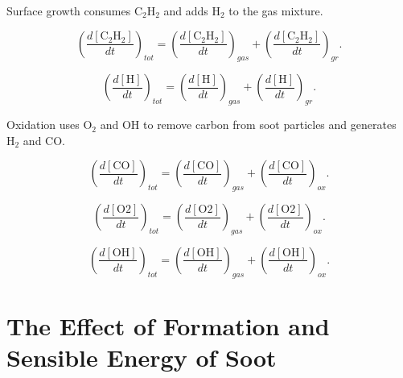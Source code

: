 Surface growth consumes $\mathrm{C_2H_2}$ and adds $\mathrm{H_2}$ to the gas mixture.

\begin{equation}
	\left(
	\frac{d\left[{\mathrm{C_2H_2}}\right]}{dt}
	\right)_{tot}
	= 
	\left(
	\frac{d\left[{\mathrm{C_2H_2}}\right]}{dt}
	\right)_{gas}
	+
	\left(
	\frac{d\left[{\mathrm{C_2H_2}}\right]}{dt}
	\right)_{gr}
	\label{eqn:C2H2scrub_total}.
\end{equation}


\begin{equation}
	\left(
	\frac{d\left[{\mathrm{H}}\right]}{dt}
	\right)_{tot}
	= 
	\left(
	\frac{d\left[{\mathrm{H}}\right]}{dt}
	\right)_{gas}
	+
	\left(
	\frac{d\left[{\mathrm{H}}\right]}{dt}
	\right)_{gr}
	\label{eqn:Hscrub_total}.
\end{equation}

Oxidation uses $\mathrm{O_2}$ and $\mathrm{OH}$ to remove carbon from soot particles and generates $\mathrm{H_2}$ and $\mathrm{CO}$.

\begin{equation}
	\left(
	\frac{
		d\left[
		\mathrm{CO}
		\right]
	}{dt}
	\right)_{tot}
	= 
	\left(
	\frac{d\left[{\mathrm{CO}}\right]}{dt}
	\right)_{gas}
	+
	\left(
	\frac{d\left[{\mathrm{CO}}\right]}{dt}
	\right)_{ox}
	\label{eqn:COscrub_total}.
\end{equation}

\begin{equation}
	\left(
	\frac{
		d\left[
		\mathrm{O2}
		\right]
	}{dt}
	\right)_{tot}
	= 
	\left(
	\frac{d\left[{\mathrm{O2}}\right]}{dt}
	\right)_{gas}
	+
	\left(
	\frac{d\left[{\mathrm{O2}}\right]}{dt}
	\right)_{ox}
	\label{eqn:O2scrub_total}.
\end{equation}

\begin{equation}
	\left(
	\frac{
		d\left[
		\mathrm{OH}
		\right]
	}{dt}
	\right)_{tot}
	= 
	\left(
	\frac{d\left[{\mathrm{OH}}\right]}{dt}
	\right)_{gas}
	+
	\left(
	\frac{d\left[{\mathrm{OH}}\right]}{dt}
	\right)_{ox}
	\label{eqn:OHscrub_total}.
\end{equation}

\section{The Effect of Formation and Sensible Energy of Soot}

